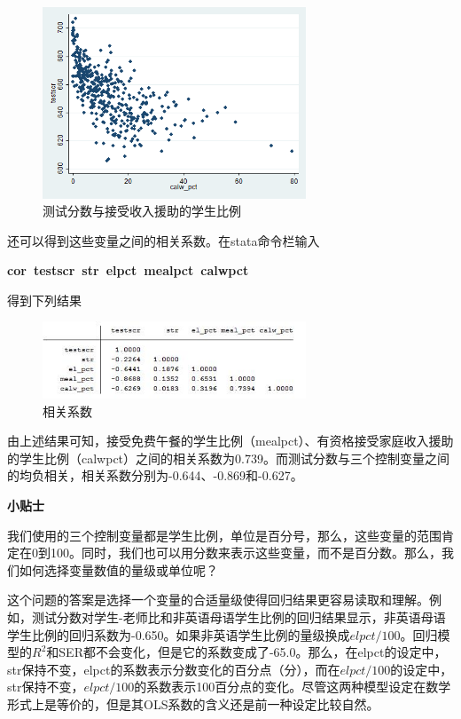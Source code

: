 \documentclass[cn,10pt,math=newtx,citestyle=gb7714-2015,bibstyle=gb7714-2015]{elegantbook}
\begin{document}
	\begin{figure}[htbp]
		\centering
		\includegraphics[width=0.7\textwidth]{income.png}
		\caption{测试分数与接受收入援助的学生比例}\label{fig:digit}
	\end{figure}
	
	还可以得到这些变量之间的相关系数。在stata命令栏输入
	
	\textbf{ cor~testscr~str~elpct~mealpct~calwpct}
	
	得到下列结果
	\begin{figure}[htbp]
		\centering
		\includegraphics[width=0.7\textwidth]{corr.jpg}
		\caption{相关系数}\label{fig:digit}
	\end{figure}
	
	由上述结果可知，接受免费午餐的学生比例（mealpct）、有资格接受家庭收入援助的学生比例（calwpct）之间的相关系数为0.739。而测试分数与三个控制变量之间的均负相关，相关系数分别为-0.644、-0.869和-0.627。
	
	\textbf{小贴士}
	
	我们使用的三个控制变量都是学生比例，单位是百分号，那么，这些变量的范围肯定在0到100。同时，我们也可以用分数来表示这些变量，而不是百分数。那么，我们如何选择变量数值的量级或单位呢？
	
	这个问题的答案是选择一个变量的合适量级使得回归结果更容易读取和理解。例如，测试分数对学生-老师比和非英语母语学生比例的回归结果显示，非英语母语学生比例的回归系数为-0.650。如果非英语学生比例的量级换成$elpct/100$。回归模型的$R^2$和SER都不会变化，但是它的系数变成了-65.0。那么，在elpct的设定中，str保持不变，elpct的系数表示分数变化的百分点（分），而在$elpct/100$的设定中，str保持不变，$elpct/100$的系数表示100百分点的变化。尽管这两种模型设定在数学形式上是等价的，但是其OLS系数的含义还是前一种设定比较自然。
	
\end{document}
